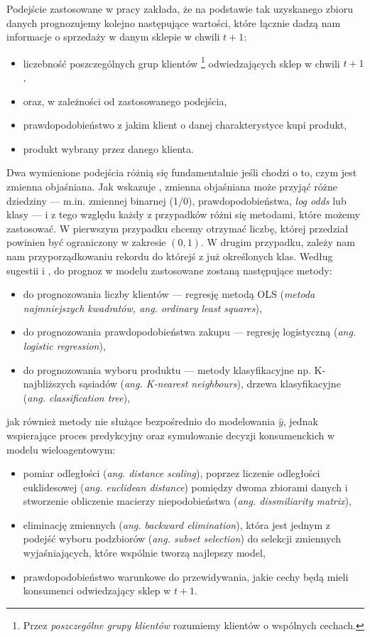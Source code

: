 \documentclass[polish, twoside, 12pt, a4paper]{article}
\theoremstyle{definition}
\theoremstyle{plain}
\theoremstyle{remark}
\begin{document}
Podejście zastosowane w pracy zakłada, że na podstawie tak uzyskanego zbioru danych prognozujemy kolejno następujące wartości, które łącznie dadzą nam informacje o sprzedaży w danym sklepie w chwili $t+1$:
	\begin{itemize} 
		\item liczebność poszczególnych grup klientów \footnote{Przez \textit{poszczególne grupy klientów} rozumiemy klientów o wspólnych cechach.} odwiedzających sklep w chwili $t+1$,
		\item[]oraz, w zależności od zastosowanego podejścia,

		\item prawdopodobieństwo z jakim klient o danej charakterystyce kupi produkt,
		\item produkt wybrany przez danego klienta. 
	\end{itemize}

Dwa wymienione podejścia różnią się fundamentalnie jeśli chodzi o to, czym jest zmienna objaśniana. Jak wskazuje \cite{James2013}, zmienna objaśniana może przyjąć różne dziedziny --- m.in. zmiennej binarnej (1/0), prawdopodobieństwa, \textit{log odds} lub klasy --- i z tego względu każdy z przypadków różni się metodami, które możemy zastosować. W pierwszym przypadku chcemy otrzymać liczbę, której przedział powinien być ograniczony w zakresie $(0,1)$. W drugim przypadku, zależy nam nam przyporządkowaniu rekordu do którejś z już określonych klas. Według sugestii \cite{James2013} i \cite{hastie2001}, do prognoz w modelu zastosowane zostaną następujące metody:

	\begin{itemize} 
		\item do prognozowania liczby klientów --- regresję metodą OLS (\textit{metoda najmniejszych kwadratów, ang. ordinary least squares}),
		\item do prognozowania prawdopodobieństwa zakupu --- regresję logistyczną (\textit{ang. logistic regression}),
		\item do prognozowania wyboru produktu --- metody klasyfikacyjne np. K-najbliższych sąsiadów (\textit{ang. K-nearest neighbours}), drzewa klasyfikacyjne (\textit{ang. classification tree}),
	\end{itemize}
	jak również metody nie służące bezpośrednio do modelowania $\hat{y}$, jednak wspierające proces predykcyjny oraz symulowanie decyzji konsumenckich w modelu wieloagentowym:
	\begin{itemize} 
		\item pomiar odległości (\textit{ang. distance scaling}), poprzez liczenie odległości euklidesowej (\textit{ang. euclidean distance}) pomiędzy dwoma zbiorami danych i stworzenie obliczenie macierzy niepodobieństwa (\textit{ang. dissmiliarity matrix}),
		\item eliminację zmiennych (\textit{ang. backward elimination}), która jest jednym z podejść wyboru podzbiorów (\textit{ang. subset selection}) do selekcji zmiennych wyjaśniających, które wspólnie tworzą najlepszy model,
		\item prawdopodobieństwo warunkowe do przewidywania, jakie cechy będą mieli konsumenci odwiedzający sklep w $t+1$.
	\end{itemize}	
\end{document}

